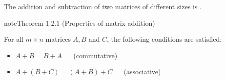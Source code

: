 \documentclass[letterpaper,10pt,english]{jupyterBook}
\begin{document}
\sphinxAtStartPar
The addition and subtraction of two matrices of different sizes is .
\label{_pages/1.1_Matrix_operations:properties-of-matrix-addition-theorem}
\begin{sphinxadmonition}{note}{Theorem 1.2.1 (Properties of matrix addition)}



\sphinxAtStartPar
For all \(m \times n\) matrices \(A,B\) and \(C\), the following conditions are satisfied:
\begin{itemize}
\item {} 
\sphinxAtStartPar
\(A + B = B + A\)    (commutative)

\item {} 
\sphinxAtStartPar
\(A + (B + C) = (A + B) + C\)    (associative)

\end{itemize}
\end{sphinxadmonition}
\label{_pages/1.1_Matrix_operations:matrix-addition-example}
\end{document}
